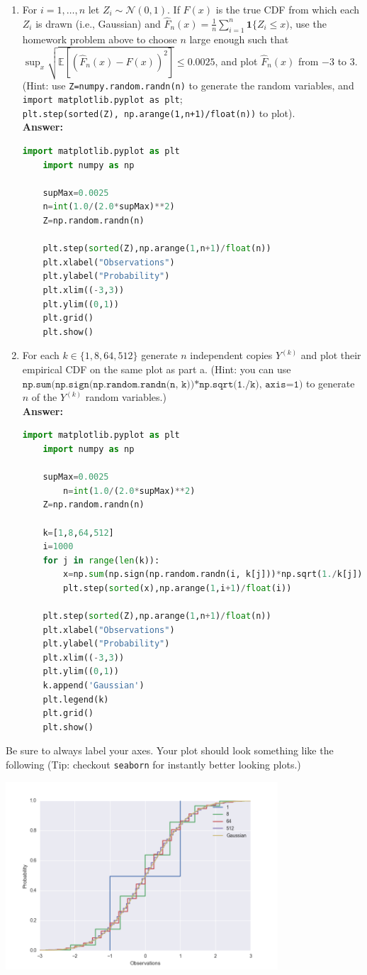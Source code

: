 \documentclass{article}
\newcommand{\1}{\mathbf{1}}
\newcommand{\E}{\mathbb{E}}
\begin{document}
\begin{enumerate}
	\item For $i=1,\dots,n$ let $Z_i \sim \mathcal{N}(0,1)$. If $F(x)$ is the true CDF from which each $Z_i$ is drawn (i.e., Gaussian) and $\widehat{F}_n(x) = \frac{1}{n} \sum_{i=1}^n \1\{ Z_i \leq x)$, use the homework problem above to choose $n$ large enough such that $\sup_x \sqrt{\E[ (\widehat{F}_n(x)-F(x))^2 ]} \leq 0.0025$, and plot $\widehat{F}_n(x)$ from $-3$ to $3$. (Hint: use \texttt{Z=numpy.random.randn(n)} to generate the random variables, and \texttt{import matplotlib.pyplot as plt};\\ \texttt{plt.step(sorted(Z), np.arange(1,n+1)/float(n))} to plot).\\
	\textbf{Answer:}
	\begin{lstlisting}[language=Python]
	import matplotlib.pyplot as plt
	import numpy as np
	
	supMax=0.0025
	n=int(1.0/(2.0*supMax)**2)
	Z=np.random.randn(n)
	
	plt.step(sorted(Z),np.arange(1,n+1)/float(n))
	plt.xlabel("Observations")
	plt.ylabel("Probability")
	plt.xlim((-3,3))
	plt.ylim((0,1))
	plt.grid()
	plt.show()

	\end{lstlisting}
	\item For each $k \in \{1, 8, 64, 512\}$ generate $n$ independent copies $Y^{(k)}$ and plot their empirical CDF on the same plot as part a. (Hint: you can use $\texttt{np.sum(np.sign(np.random.randn(n, k))*np.sqrt(1./k), axis=1)}$ to generate $n$ of the $Y^{(k)}$ random variables.)\\
	\textbf{Answer:}
	\begin{lstlisting}[language=Python]
	import matplotlib.pyplot as plt
	import numpy as np

	supMax=0.0025
		n=int(1.0/(2.0*supMax)**2)
	Z=np.random.randn(n)

	k=[1,8,64,512]
	i=1000
	for j in range(len(k)):
		x=np.sum(np.sign(np.random.randn(i, k[j]))*np.sqrt(1./k[j]), axis=1)
		plt.step(sorted(x),np.arange(1,i+1)/float(i))
	
	plt.step(sorted(Z),np.arange(1,n+1)/float(n))
	plt.xlabel("Observations")
	plt.ylabel("Probability")
	plt.xlim((-3,3))
	plt.ylim((0,1))
	k.append('Gaussian')
	plt.legend(k)
	plt.grid()
	plt.show()

\end{lstlisting}
\end{enumerate}
Be sure to always label your axes. 
Your plot should look something like the following (Tip: checkout \texttt{seaborn} for instantly better looking plots.)
\begin{center}
\includegraphics[width=4in]{full.png}
\end{center} 
\end{document}
